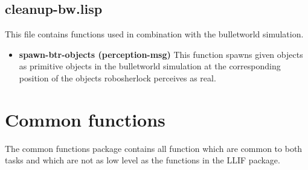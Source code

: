 \documentclass[main.tex]{subfiles}
\begin{document}
	    \subsection{cleanup-bw.lisp}
        This file contains functions used in combination with the bulletworld simulation.
		\begin{itemize}
			\item \textbf{spawn-btr-objects (perception-msg)}
			This function spawns given objects as primitive objects in the bulletworld simulation at the corresponding position of the objects robosherlock perceives as real.
		\end{itemize}
	  	
	  	\section{Common functions}
	  	\label{comf}
	  	
		The common functions package contains all function which are common to both tasks and which are not as low level as the functions in the LLIF package.
\end{document}
